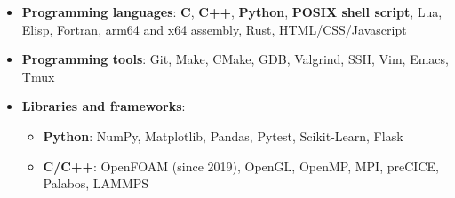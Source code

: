 {
  \vspace{0.5em}
  \begin{itemize}
    \setlength\itemsep{0.5em}
    \shorthandoff{:}
    \item \textbf{Programming languages}: \textbf{C}, \textbf{C++}, \textbf{Python}, \textbf{POSIX shell script}, Lua, Elisp, Fortran, arm64 and x64 assembly, Rust, HTML/CSS/Javascript
    \item \textbf{Programming tools}: Git, Make, CMake, GDB, Valgrind, SSH, Vim, Emacs, Tmux
    \item \textbf{Libraries and frameworks}:
      \vspace{0.5em}
      \begin{itemize}
        \setlength\itemsep{0.3em}
        \item \textbf{Python}: NumPy, Matplotlib, Pandas, Pytest, Scikit-Learn, Flask
        \item \textbf{C/C++}: OpenFOAM (since 2019), OpenGL, OpenMP, MPI, preCICE, Palabos, LAMMPS
      \end{itemize}


\end{itemize}}

